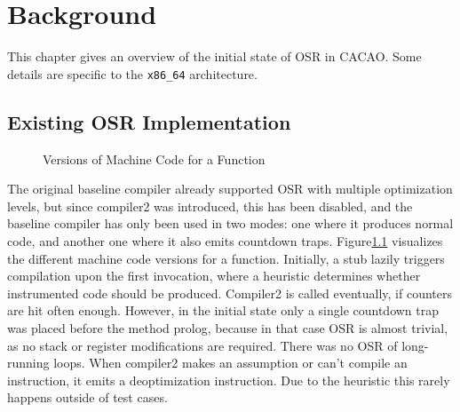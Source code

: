 \documentclass[draft,final]{vutinfth} %
\begin{document}
    \chapter{Background}

    This chapter gives an overview of the initial state of OSR in CACAO.
    Some details are specific to the \texttt{x86\_64} architecture.


    \section{Existing OSR Implementation}

    \begin{figure}
        \centering
        \caption{Versions of Machine Code for a Function}
        \label{fig:code-versions}
    \end{figure}

    The original baseline compiler already supported OSR with multiple optimization levels,
    but since compiler2 was introduced,
    this has been disabled,
    and the baseline compiler has only been used in two modes:
    one where it produces normal code,
    and another one where it also emits countdown traps.
    Figure\ref{fig:code-versions} visualizes the different machine code versions for a function.
    Initially, a stub lazily triggers compilation upon the first invocation,
    where a heuristic determines whether instrumented code should be produced.
    Compiler2 is called eventually,
    if counters are hit often enough.
    However, in the initial state only a single countdown trap was placed before the method prolog,
    because in that case OSR is almost trivial,
    as no stack or register modifications are required.
    There was no OSR of long-running loops.
    When compiler2 makes an assumption or can't compile an instruction, it emits a deoptimization instruction.
    Due to the heuristic this rarely happens outside of test cases.
\end{document}
